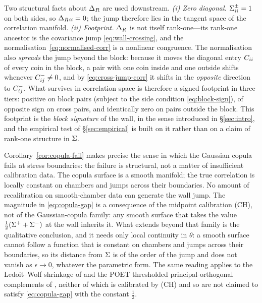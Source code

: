 Two structural facts about $\Delta_R$ are used downstream. \emph{(i) Zero diagonal.} $\Sigma^\pm_{ii}=1$ on both sides, so $\Delta_R{}_{ii}=0$; the jump therefore lies in the tangent space of the correlation manifold. \emph{(ii) Footprint.} $\Delta_R$ is not itself rank-one---its rank-one ancestor is the covariance jump \eqref{eq:wall-crossing}, and the normalisation~\eqref{eq:normalised-corr} is a nonlinear congruence. The normalisation also \emph{spreads} the jump beyond the block: because it moves the diagonal entry $C_{ii}$ of every coin in the block, a pair with one coin inside and one outside shifts whenever $C^-_{ij}\neq 0$, and by \eqref{eq:cross-jump-corr} it shifts in the \emph{opposite} direction to $C^-_{ij}$. What survives in correlation space is therefore a signed footprint in three tiers: positive on block pairs (subject to the side condition \eqref{eq:block-sign}), of opposite sign on cross pairs, and identically zero on pairs outside the block. This footprint is the \emph{block signature} of the wall, in the sense introduced in \S\ref{sec:intro}, and the empirical test of \S\ref{sec:empirical} is built on it rather than on a claim of rank-one structure in $\Sigma$.

Corollary~\ref{cor:copula-fail} makes precise the sense in which the Gaussian copula fails at stress boundaries: the failure is structural, not a matter of insufficient calibration data. The copula surface is a smooth manifold; the true correlation is locally constant on chambers and jumps across their boundaries. No amount of recalibration on smooth-chamber data can generate the wall jump. The magnitude in \eqref{eq:copula-gap} is a consequence of the midpoint calibration (CH), not of the Gaussian-copula family: any smooth surface that takes the value $\tfrac12(\Sigma^++\Sigma^-)$ at the wall inherits it. What extends beyond that family is the qualitative conclusion, and it needs only local continuity in $\theta$: a smooth surface cannot follow a function that is constant on chambers and jumps across their boundaries, so its distance from $\Sigma$ is of the order of the jump and does not vanish as $\epsilon\to0$, whatever the parametric form. The same reading applies to the Ledoit--Wolf shrinkage of \citet{LedoitWolf2004} and the POET thresholded principal-orthogonal complements of \citet{FanLiaoMincheva2013}, neither of which is calibrated by (CH) and so are not claimed to satisfy \eqref{eq:copula-gap} with the constant $\tfrac12$.
